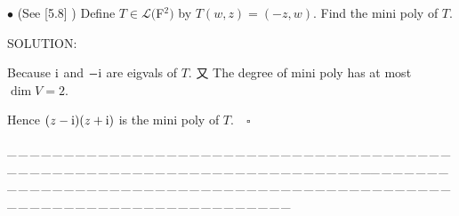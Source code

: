 \documentclass[a4paper, 11pt, UTF8]{article}
\def\i{\textup{i}}
\def\Lm{\mathcal{L}}
\begin{document}
\begin{large}
{\small $\bullet$} (See [5.8] ) {\timessl\Large 
Define $T\in\Lm(${\timesbf F}$^2)$ by $T(w, z) = (-z, w)$. Find the mini poly of $T$.
}\par
{\timesbf S\footnotesize{OLUTION:}}\par\quad
Because $\i$ and $-\i$ are eigvals of $T.$ 又 The degree of mini poly has at most $\dim V=2.$\par\quad
Hence $(z-\i)(z+\i)$ is the mini poly of $T$.$\quad\square$\par
{\tiny \_\,\_\,\_\,\_\,\_\,\_\,\_\,\_\,\_\,\_\,\_\,\_\,\_\,\_\,\_\,\_\,\_\,\_\,\_\,\_\,\_\,\_\,\_\,\_\,\_\,\_\,\_\,\_\,\_\,\_\,\_\,\_\,\_\,\_\,\_\,\_\,\_\,\_\,\_\,\_\,\_\,\_\,\_\,\_\,\_\,\_\,\_\,\_\,\_\,\_\,\_\,\_\,\_\,\_\,\_\,\_\,\_\,\_\,\_\,\_\,\_\,\_\,\_\,\_\,\_\,\_\,\_\,\_\,\_\,\_\,\_\_\,\_\,\_\,\_\,\_\,\_\,\_\,\_\,\_\,\_\,\_\,\_\,\_\,\_\,\_\,\_\,\_\,\_\,\_\,\_\,\_\,\_\,\_\,\_\,\_\,\_\,\_\,\_\,\_\,\_\,\_\,\_\,\_\,\_\,\_\,\_\,\_\,\_\,\_\,\_\,\_\,\_\,\_\,\_\,\_\,\_\,\_\,\_\,\_\,\_\,\_\,\_\,\_\,\_\,\_\,\_\,\_\,\_\,\_\,\_\,\_\,\_\,\_\,\_\,\_\,\_\,\_\,\_\,\_\,\_\,\_}\par



\end{large}
\end{document}
